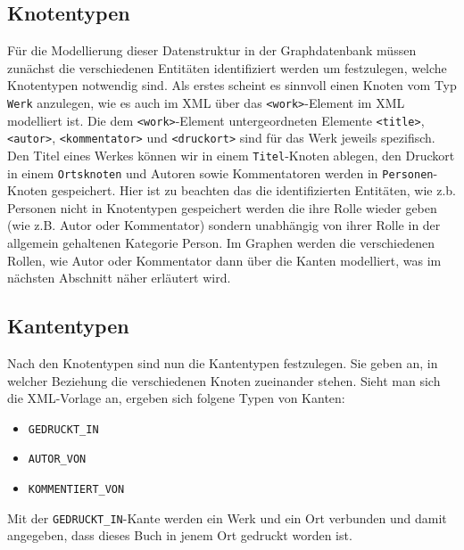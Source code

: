 \hypertarget{knotentypen}{%
\subsection{Knotentypen}\label{knotentypen}}

Für die Modellierung dieser Datenstruktur in der Graphdatenbank müssen
zunächst die verschiedenen Entitäten identifiziert werden um
festzulegen, welche Knotentypen notwendig sind. Als erstes scheint es
sinnvoll einen Knoten vom Typ \texttt{Werk} anzulegen, wie es auch im
XML über das \texttt{\textless{}work\textgreater{}}-Element im XML
modelliert ist. Die dem \texttt{\textless{}work\textgreater{}}-Element
untergeordneten Elemente \texttt{\textless{}title\textgreater{}},
\texttt{\textless{}autor\textgreater{}},
\texttt{\textless{}kommentator\textgreater{}} und
\texttt{\textless{}druckort\textgreater{}} sind für das Werk jeweils
spezifisch. Den Titel eines Werkes können wir in einem
\texttt{Titel}-Knoten ablegen, den Druckort in einem \texttt{Ortsknoten}
und Autoren sowie Kommentatoren werden in \texttt{Personen}-Knoten
gespeichert. Hier ist zu beachten das die identifizierten Entitäten, wie
z.b. Personen nicht in Knotentypen gespeichert werden die ihre Rolle
wieder geben (wie z.B. Autor oder Kommentator) sondern unabhängig von
ihrer Rolle in der allgemein gehaltenen Kategorie Person. Im Graphen
werden die verschiedenen Rollen, wie Autor oder Kommentator dann über
die Kanten modelliert, was im nächsten Abschnitt näher erläutert wird.

\hypertarget{kantentypen}{%
\subsection{Kantentypen}\label{kantentypen}}

Nach den Knotentypen sind nun die Kantentypen festzulegen. Sie geben an,
in welcher Beziehung die verschiedenen Knoten zueinander stehen. Sieht
man sich die XML-Vorlage an, ergeben sich folgene Typen von Kanten:

\begin{itemize}
\tightlist
\item
  \texttt{GEDRUCKT\_IN}
\item
  \texttt{AUTOR\_VON}
\item
  \texttt{KOMMENTIERT\_VON}
\end{itemize}

Mit der \texttt{GEDRUCKT\_IN}-Kante werden ein Werk und ein Ort
verbunden und damit angegeben, dass dieses Buch in jenem Ort gedruckt
worden ist.

